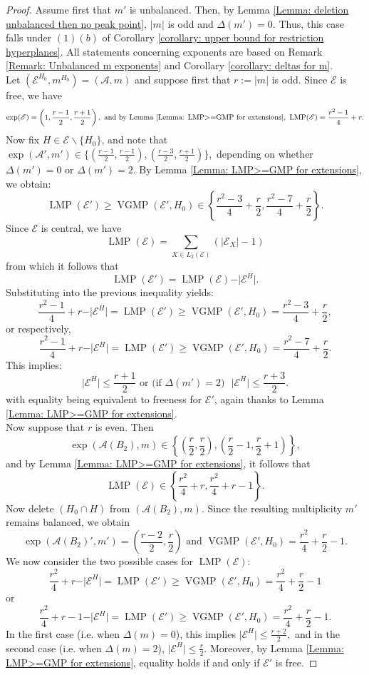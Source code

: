 \documentclass[12pt]{amsart}
\theoremstyle{definition}
\theoremstyle{remark}
\DeclareMathOperator{\LMP}{LMP}
\DeclareMathOperator{\VGMP}{VGMP}
\newcommand\CA{{\mathscr A}}
\newcommand\CE{{\mathscr E}}
\begin{document}
\begin{proof}
    Assume first that $m'$ is unbalanced. Then, by Lemma \ref{Lemma: deletion unbalanced then no peak point}, $\vert m\vert$ is odd and $\Delta(m')=0$. Thus, this case falls under $(1)(b)$ of Corollary \ref{corollary: upper bound for restriction hyperplanes}. All statements concerning exponents are based on Remark \ref{Remark: Unbalanced m exponents} and Corollary \ref{corollary: deltas for m}.\\ Let $(\CE^{H_0},m^{H_0})=(\CA,m)$ and suppose first that $r:=\vert m\vert$ is odd. Since $\CE$ is free, we have $$\exp(\CE)=\left(1,\frac{r-1}{2}, \frac{r+1}{2}\right),\text{ and by Lemma \ref{Lemma: LMP>=GMP for extensions}, }\LMP(\CE)=\frac{r^2-1}{4} + r.$$ Now fix $H\in\CE\backslash\{H_0\}$, and note that $\exp(\CA',m')\in\{(\frac{r-1}{2}, \frac{r-1}{2}), (\frac{r-3}{2}, \frac{r+1}{2})\},$ depending on whether $\Delta(m')=0$ or $\Delta(m')=2$. By Lemma \ref{Lemma: LMP>=GMP for extensions}, we obtain: $$\LMP(\CE')\geq\VGMP(\CE',H_0)\in\left\{\frac{r^2-3}{4} + \frac{r}{2}, \frac{r^2-7}{4} + \frac{r}{2} \right\}.$$ Since $\CE$ is central, we have $$\LMP(\CE)=\sum_{X\in L_2(\CE)}(\vert\CE_X\vert-1)$$ from which it follows that $$\LMP(\CE')=\LMP(\CE)-\vert \CE^H\vert.$$ Substituting into the previous inequality yields: $$\frac{r^2-1}{4} + r - \vert \CE^H\vert=\LMP(\CE')\geq \VGMP(\CE',H_0)= \frac{r^2-3}{4} + \frac{r}{2},$$ or respectively, 
    $$\frac{r^2-1}{4} + r - \vert \CE^H\vert=\LMP(\CE')\geq \VGMP(\CE',H_0)= \frac{r^2-7}{4} + \frac{r}{2}.$$
    This implies: $$\vert\CE^H\vert\leq\frac{r+1}{2}\text{ or (if } \Delta(m')=2)\mbox{ } \vert\CE^H\vert\leq\frac{r+3}{2}.$$ with equality being equivalent to freeness for $\CE'$, again thanks to Lemma \ref{Lemma: LMP>=GMP for extensions}.\\
    Now suppose that $r$ is even. Then $$\exp(\CA(B_2),m)\in\left\{(\frac{r}{2},\frac{r}{2}),(\frac{r}{2}-1,\frac{r}{2}+1) \right\},$$ and by Lemma \ref{Lemma: LMP>=GMP for extensions}, it follows that $$\LMP(\CE)\in\left\{\frac{r^2 }{4} + r, \frac{r^2 }{4} + r - 1\right\}.$$ Now delete $(H_0\cap H)$ from $(\CA(B_2),m)$. Since the resulting multiplicity $m'$ remains balanced, we obtain $$\exp(\CA(B_2)',m')=\left(\frac{r-2}{2},\frac{r}{2}\right)\text{ and }\VGMP(\CE',H_0)=\frac{r^2}{4}+\frac{r}{2}-1.$$ We now consider the two possible cases for $\LMP(\CE)$: 
    $$\frac{r^2 }{4} + r - \vert \CE^H\vert=\LMP(\CE')\geq \VGMP(\CE',H_0)=\frac{r^2}{4} + \frac{r}{2} - 1$$
    or $$\frac{r^2 }{4} + r- 1 - \vert \CE^H\vert=\LMP(\CE')\geq \VGMP(\CE',H_0)=\frac{r^2}{4} + \frac{r}{2} - 1.$$
    In the first case (i.e. when $\Delta(m)=0$), this implies $\vert\CE^H\vert\leq \frac{r+2}{2},$ and in the second case (i.e. when $\Delta(m)=2$), $\vert\CE^H\vert\leq \frac{r}{2}.$ Moreover, by Lemma \ref{Lemma: LMP>=GMP for extensions}, equality holds if and only if $\CE'$ is free.
\end{proof}
\end{document}
